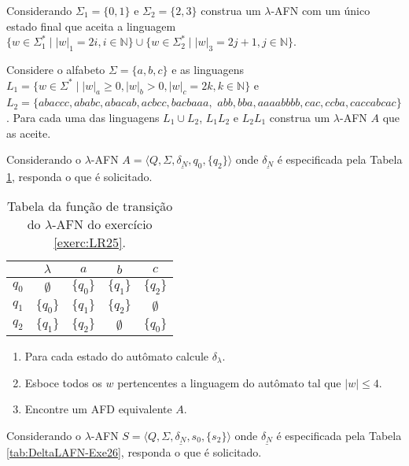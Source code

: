 \begin{exercise}\label{exerc:LR23}
	Considerando $\Sigma_1 = \{0, 1\}$  e $\Sigma_2 = \{2, 3\}$ construa um $\lambda$-AFN com um único estado final que aceita a linguagem $\{w \in \Sigma_1^* \mid |w|_1 = 2i, i \in \mathbb{N}\} \cup \{w \in \Sigma_2^* \mid |w|_3 = 2j + 1, j\in \mathbb{N}\} $. 
\end{exercise}

\begin{exercise}\label{exerc:LR24}
	Considere o alfabeto $\Sigma = \{a, b, c\}$ e as linguagens  $L_1 = \{w \in \Sigma^* \mid |w|_a \geq 0, |w|_b > 0, |w|_c = 2k, k \in \mathbb{N}\}$ e $L_2 = \{abaccc, ababc, abacab, acbcc, bacbaaa,$ $abb, bba, aaaabbbb, cac, ccba, caccabcac\}$. Para cada uma das linguagens $L_1 \cup L_2$, $L_1L_2$ e $L_2L_1$ construa um $\lambda$-AFN $A$ que as aceite.
\end{exercise}

\begin{exercise}\label{exerc:LR25}
	Considerando o $\lambda$-AFN $A = \langle Q, \Sigma, \underline{\delta_N}, q_0, \{q_2\} \rangle$ onde $\underline{\delta_N}$ é especificada pela Tabela \ref{tab:DeltaLAFN-Exe25}, responda o que é solicitado.
\end{exercise}

\begin{table}[h]
	\centering
	\begin{tabular}{c|cccc}
		\backslashbox{$Q'$}{$\Sigma$}	& $\lambda$ & $a$ & $b$ & $c$\\\hline
		$q_0$ & $\emptyset$ & $\{q_0\}$ & $\{q_1\}$ & $\{q_2\}$\\
		$q_1$ & $\{q_0\}$ & $\{q_1\}$ & $\{q_2\}$ & $\emptyset$\\
		$q_2$ & $\{q_1\}$ & $\{q_2\}$ & $\emptyset$ & $\{q_0\}$ 		
	\end{tabular}
	\caption{Tabela da função de transição do $\lambda$-AFN do exercício \ref{exerc:LR25}.}
	\label{tab:DeltaLAFN-Exe25}
\end{table}

\begin{enumerate}
	\item Para cada estado do autômato calcule $\delta_\lambda$.
	\item Esboce todos os $w$ pertencentes a linguagem do autômato tal que $|w| \leq 4$.
	\item Encontre um AFD equivalente $A$. 
\end{enumerate}

\begin{exercise}\label{exerc:LR26}
	Considerando o $\lambda$-AFN $S = \langle Q, \Sigma, \underline{\delta_N}, s_0, \{s_2\} \rangle$ onde $\underline{\delta_N}$ é especificada pela Tabela \ref{tab:DeltaLAFN-Exe26}, responda o que é solicitado.
\end{exercise}

